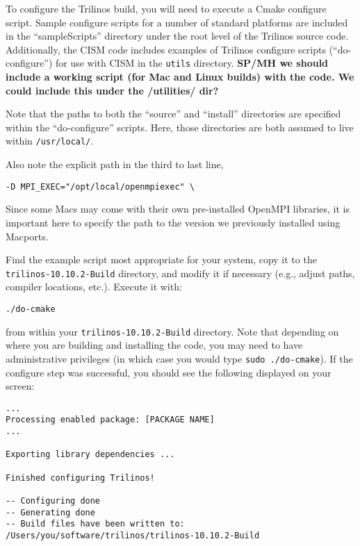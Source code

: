 To configure the Trilinos build, you will need to execute a Cmake configure script. 
Sample configure scripts for a number of standard platforms are included in the ``sampleScripts''
 directory under the root level of the Trilinos source code. 
Additionally, the CISM code includes examples of Trilinos configure scripts (``do-configure'') 
for use with CISM in the \texttt{utils} directory. 
\textbf{SP/MH we should include a working script (for Mac and Linux builds) with the code. We could include this under the /utilities/ dir?}

Note that the paths to both the ``source'' and ``install'' directories are specified within the ``do-configure'' scripts. Here, those directories are both assumed to live within \texttt{/usr/local/}. 

\begin{mdframed}[style=mac] %
Also note the explicit path in the third to last line, 

\begin{verbatim}
-D MPI_EXEC="/opt/local/openmpiexec" \
\end{verbatim}

Since some Macs may come with their own pre-installed OpenMPI libraries, it is important here to specify the path to the version we previously installed using Macports.
\end{mdframed}              %

Find the example script most appropriate for your system, copy it to the \texttt{trilinos-10.10.2-Build} directory, and modify it if necessary (e.g., adjust paths, compiler locations, etc.).
Execute it with: 

\texttt{./do-cmake}

from within your \texttt{trilinos-10.10.2-Build} directory. Note that depending on where you are building and installing the code, you may need to have administrative privileges (in which case you would type \texttt{sudo ./do-cmake}). If the configure step was successful, you should see the following displayed on your screen:

\begin{verbatim}
...
Processing enabled package: [PACKAGE NAME]
...

Exporting library dependencies ...

Finished configuring Trilinos!

-- Configuring done
-- Generating done
-- Build files have been written to: /Users/you/software/trilinos/trilinos-10.10.2-Build
\end{verbatim}

